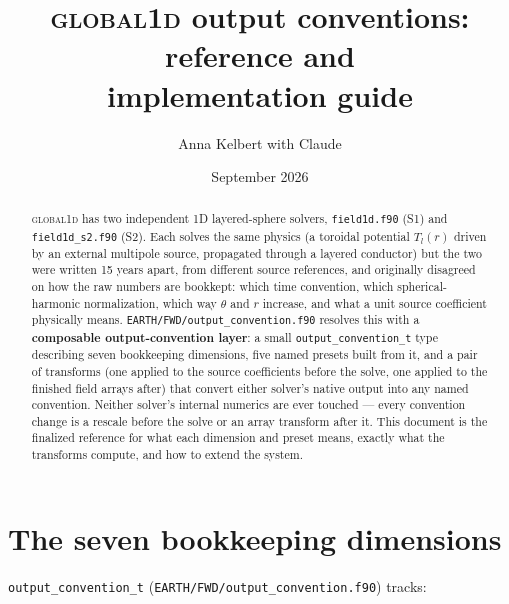 \documentclass[11pt]{article}
\title{\textsc{global1d} output conventions: reference and\\ implementation guide}
\author{Anna Kelbert with Claude}
\date{September 2026}
\begin{document}
\maketitle

\begin{abstract}
\textsc{global1d} has two independent 1D layered-sphere solvers, \texttt{field1d.f90} (S1) and
\texttt{field1d\_s2.f90} (S2). Each solves the same physics (a toroidal potential $T_l(r)$ driven
by an external multipole source, propagated through a layered conductor) but the two were written
15 years apart, from different source references, and originally disagreed on how the raw numbers
are bookkept: which time convention, which spherical-harmonic normalization, which way $\theta$
and $r$ increase, and what a unit source coefficient physically means.
\texttt{EARTH/FWD/output\_convention.f90} resolves this with a \textbf{composable output-convention
layer}: a small \texttt{output\_convention\_t} type describing seven bookkeeping dimensions, five
named presets built from it, and a pair of transforms (one applied to the source coefficients
before the solve, one applied to the finished field arrays after) that convert either solver's
native output into any named convention. Neither solver's internal numerics are ever touched ---
every convention change is a rescale before the solve or an array transform after it. This
document is the finalized reference for what each dimension and preset means, exactly what the
transforms compute, and how to extend the system.
\end{abstract}

\section{The seven bookkeeping dimensions}

\texttt{output\_convention\_t} (\texttt{EARTH/FWD/output\_convention.f90}) tracks:
\end{document}
